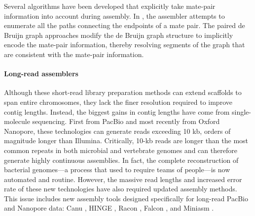 Several algorithms have been developed that
explicitly take mate-pair information into account during assembly.
 In \citep{butler2008allpaths, bankevich2012spades}, the assembler attempts to enumerate all the paths connecting the endpoints of a mate pair.
The paired de Bruijn graph \citep{medvedev2011paired} approaches modify the de Bruijn graph
structure to implicitly encode the mate-pair information, thereby resolving segments of the graph
that are consistent with the mate-pair information.
\paragraph{Long-read assemblers}
Although these short-read library preparation methods can extend scaffolds to span entire chromosomes, 
they lack the finer resolution required to improve contig lengths. 
Instead, the biggest gains in contig lengths have come from single-molecule sequencing. First from PacBio and most recently from Oxford Nanopore, these technologies can generate reads exceeding 10 kb, orders of magnitude longer than Illumina. 
Critically, 10-kb reads are longer than the most common repeats in both microbial and vertebrate genomes and can therefore generate highly continuous assemblies. 
In fact, the complete reconstruction of bacterial genomes—a process that used to require teams of people—is now automated and routine. 
However, the massive read lengths and increased error rate of these new technologies have also required updated assembly methods. 
This issue includes new assembly tools designed specifically for long-read PacBio and Nanopore data: Canu \citep{koren2017canu}, HINGE \citep{kamath2017hinge}, Racon \citep{vaser2017fast}, Falcon \citep{chin2016phased}, and Miniasm \citep{li2016minimap}.

